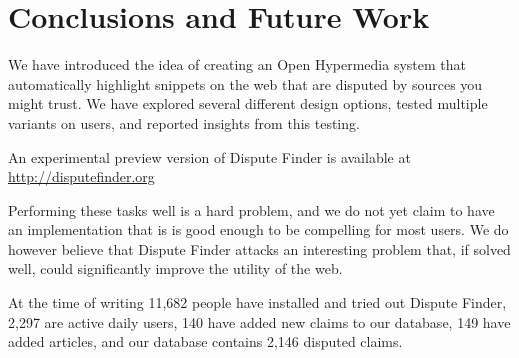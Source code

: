 \documentclass{www2010-submission}
\newcommand{\todo}[1]{}
\begin{document}
\todo{Come up with terminology for marking an evidence snippet, and agree on evidence vs source vs article}
\todo{Talk about how the early versions conflated evidence and snippets - and whether it makes sense to distinguish between them}
\todo{Screenshot of the claim graph interface}


\section{Conclusions and Future Work}

We have introduced the idea of creating an Open Hypermedia system that automatically highlight snippets on the web that are disputed by sources you might trust. We have explored several different design options, tested multiple variants on users, and reported insights from this testing.

An experimental preview version of Dispute Finder is available at 
\url{http://disputefinder.org}

Performing these tasks well is a hard problem, and we do not yet claim to have an implementation that is is good enough to be compelling for most users. We do however believe that Dispute Finder attacks an interesting problem that, if solved well, could significantly improve the utility of the web.

At the time of writing 11,682 people have installed and tried out Dispute Finder, 2,297 are active daily users, 140 have added new claims to our database, 149 have added articles, and our database contains 2,146 disputed claims. 

\todo{Add count of disputed claims}


\todo{Do we want to have acknowledgements}


\todo{Sort out bad references}

\end{document}
